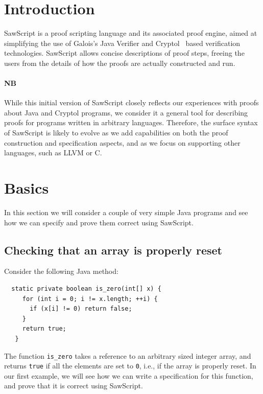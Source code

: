 \documentclass[12pt]{galois-whitepaper}
\author{Levent Erk\"{o}k $\;\;\;\;\;$ Joe Hendrix\\
\texttt{\{levent.erkok,jhendrix\}@galois.com}}
\title{\sawScript}
\date{February 2011}
\newcommand{\sawScript}{{\sc SawScript}\xspace}
\begin{document}
\maketitle

\vspace*{2cm}
\begin{abstract}
We introduce the \sawScript language, aiming to provide
a programmable interface to Galois's Java Verifier and Cryptol based
formal verification technologies. We use various simple Java programs as examples, inspired
the domain of elliptic-curve cryptography. Our proofs either directly take place within the
\sawScript specification language, or use \sawScript to equivalence check Java functions against
their Cryptol counterparts.
\end{abstract}

\newpage
\tableofcontents
\newpage

\section{Introduction}
\sawScript is a proof scripting language and its associated proof engine, aimed at simplifying the use of Galois's Java Verifier and Cryptol~\cite{Cryptol} based
verification technologies. \sawScript allows concise descriptions of proof steps, freeing the users from the details
of how the proofs are actually constructed and run.

\paragraph{NB} While this initial version of \sawScript closely reflects our experiences with proofs about Java and Cryptol
programs, we consider it a general tool for describing proofs for programs written in arbitrary languages.
Therefore, the surface
syntax of \sawScript is likely to evolve as we add capabilities on both the proof construction and specification
aspects, and as we focus on supporting other languages, such as LLVM or C.

\section{Basics}
In this section we will consider a couple of very simple Java programs and see how we can specify and prove them correct
using \sawScript.

\subsection{Checking that an array is properly reset}
Consider the following Java method:
\begin{Verbatim}
  static private boolean is_zero(int[] x) {
     for (int i = 0; i != x.length; ++i) {
       if (x[i] != 0) return false;
     }
     return true;
   }
\end{Verbatim}
The function {\tt is\_zero} takes a reference to an arbitrary sized integer array, and returns {\tt true} if all the elements
are set to {\tt 0}, i.e., if the array is properly reset. In our first example, we will see how we can write a
specification for this function, and prove that it is correct using \sawScript.
\end{document}
